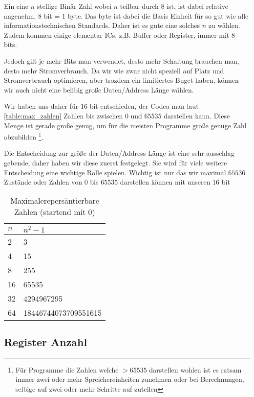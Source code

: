 \documentclass{scrartcl}
\begin{document}
Ein eine $n$ stellige Binär Zahl wobei $n$ teilbar durch $8$ ist, ist dabei relative angenehm, $8$ bit = $1$ byte. Das byte ist dabei die Basis Einheit für so gut wie alle informationstechnischen Standards. Daher ist es gute eine solches $n$ zu wählen.
Zudem kommen einige elementar ICs, z.B. Buffer oder Register, immer mit 8 bits.

Jedoch gilt je mehr Bits man verwendet, desto mehr Schaltung brauchen man, desto mehr Stromverbrauch. Da wir wie zwar nicht speziell auf Platz und Stromverbrauch optimieren, aber trozdem ein limitiertes Buget haben, können wir auch nicht eine belibig große Daten/Address Länge wählen.

Wir haben uns daher für $16$ bit entschieden, der Codea man laut \autoref{table:max_zahlen} Zahlen bis zwischen $0$ und $65535$ darstellen kann. Diese Menge ist gerade große genug, um für die meisten Programme große genüge Zahl abzubilden
\footnote{Für Programme die Zahlen welche $> 65535$ darstellen wohlen ist es ratsam immer zwei oder mehr Spreichereinheiten zunehmen oder bei Berechnungen, selbige auf zwei oder mehr Schritte auf zuteilen}.

Die Entscheidung zur größe der Daten/Address Länge ist eine sehr ausschlag gebende, daher haben wir diese zuerst festgelegt. Sie wird für viele weitere Entscheidung eine wichtige Rolle spielen. Wichtig ist nur das wir maximal $65536$ Zustände oder Zahlen von $0$ bis $65535$ darstellen können mit unseren $16$ bit

\begin{center}
	\begin{table}[h]
		\caption{\label{table:max_zahlen} Maximalerepersäntierbare Zahlen (startend mit 0)}
		\begin{tabular}{ l | l }
 		$n$ & $n^2 - 1$ \\
		\hline 
		2 & 3\\  
		4 & 15\\
		8 & 255\\
		16 & 65535\\
 		32 & 4294967295\\
 		64 & 18446744073709551615\\
		\end{tabular}
	\end{table}
\end{center}

\subsection{\label{section:comment:register_number}Register Anzahl}
\end{document}
